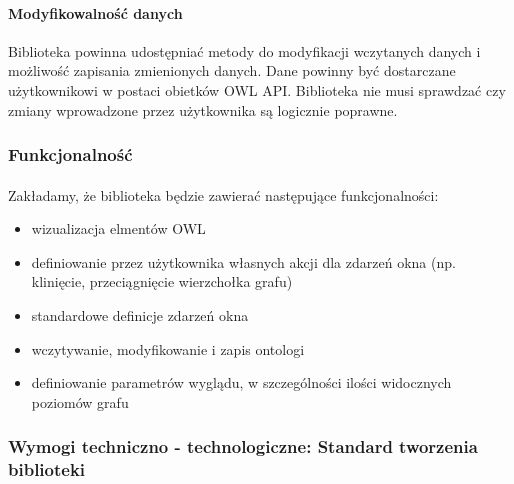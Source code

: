 \paragraph{Modyfikowalność danych} Biblioteka powinna udostępniać metody do modyfikacji wczytanych danych i możliwość zapisania zmienionych danych. Dane powinny być dostarczane użytkownikowi w postaci obietków OWL API. Biblioteka nie musi sprawdzać czy zmiany wprowadzone przez użytkownika są logicznie poprawne.

\subsubsection{Funkcjonalność}
\paragraph{} Zakładamy, że biblioteka będzie zawierać następujące funkcjonalności:
\begin{itemize}
 	\item wizualizacja elmentów OWL
	\item definiowanie przez użytkownika własnych akcji dla zdarzeń okna (np. klinięcie, przeciągnięcie wierzchołka grafu)
	\item standardowe definicje zdarzeń okna
	\item wczytywanie, modyfikowanie i zapis ontologi
	\item definiowanie parametrów wyglądu, w szczególności ilości widocznych poziomów grafu
\end{itemize}



\subsubsection[Wymogi techniczno - technologiczne]{Wymogi techniczno - technologiczne: Standard tworzenia biblioteki }


